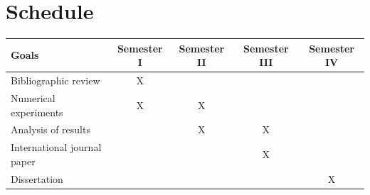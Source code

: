\documentclass[a4,useAMS,usenatbib,usegraphicx,12pt]{article}
\begin{document}
\section{Schedule}


\begin{table}[h]
\begin{flushleft}
\begin{center}
  \begin{tabular}{l  c c c c } \hline\hline
	\centering\textbf{Goals} & \textbf{Semester I} & \textbf{Semester II} & \textbf{Semester III} & \textbf{Semester IV} \\ \hline\hline
	 Bibliographic review & X & & & \\
	 Numerical experiments & X & X & & \\
	 Analysis of results &  & X & X & \\
	 International journal paper &  &  & X & \\
	 Dissertation &  &  &  & X \\
	\hline\hline
  \end{tabular}  
\end{center}
\end{flushleft}
\end{table}


\newpage

\renewcommand{\bibname}{8\ \ \ \ Bibliography}
\small

\end{document}
